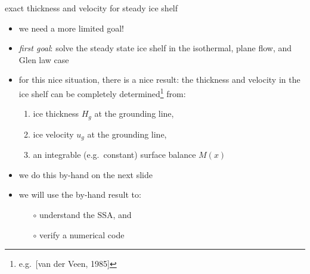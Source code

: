 \begin{frame}{exact thickness and velocity for steady ice shelf}


\begin{itemize}
\item we need a more limited goal!
\item \emph{first goal}:  solve the steady state ice shelf in the isothermal, plane flow, and Glen law case
\item for this nice situation, there is a nice result: the thickness and velocity in the ice shelf can be completely determined\footnote{e.g.~[van der Veen, 1985]\nocite{vanderVeen85}} from:
  \begin{enumerate}
  \item ice thickness $H_g$ at the grounding line,
  \item ice velocity $u_g$ at the grounding line,
  \item an integrable (e.g.~constant) surface balance $M(x)$
  \end{enumerate}
\item we do this by-hand on the next slide
\item we will use the by-hand result to:
  \begin{itemize}
  \item[$\circ$] understand the SSA, and
  \item[$\circ$] verify a numerical code
  \end{itemize}
\end{itemize}
\end{frame}


